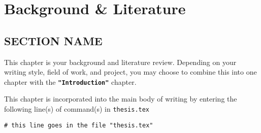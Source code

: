 \chapter{Background \& Literature}

\section{SECTION NAME}

This chapter is your background and literature review. Depending on your writing style, field of work, and project, you may choose to combine this into one chapter with the \texttt{\textbf{"Introduction"}} chapter.

This chapter is incorporated into the main body of writing by entering the following line(s) of command(s) in \texttt{thesis.tex}
\begin{verbatim}
# this line goes in the file "thesis.tex"

\end{verbatim}



